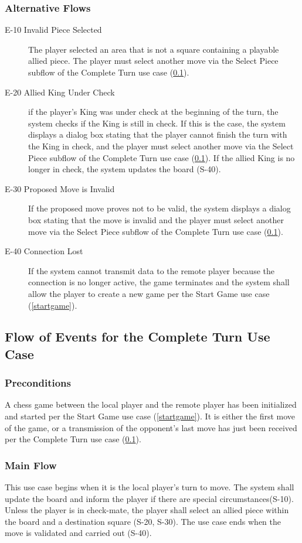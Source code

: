 \subsubsection{Alternative Flows}
\begin{description}
\item[E-10 Invalid Piece Selected]  The player selected an area that is not a square containing a playable allied piece.  The player must select another move via the Select Piece subflow of the Complete Turn use case (\ref{completeturn}). 
\item[E-20 Allied King Under Check] if the player's King was under check at the beginning of the turn, the system checks if the King is still in check.  If this is the case, the system displays a dialog box stating that the player cannot finish the turn with the King in check, and the player must select another move via the Select Piece subflow of the Complete Turn use case  (\ref{completeturn}).  If the allied King is no longer in check, the system updates the board (S-40).
\item[E-30 Proposed Move is Invalid] If the proposed move proves not to be valid, the system displays a dialog box stating that the move is invalid and the player must select another move via the Select Piece subflow of the Complete Turn use case   (\ref{completeturn}). 
\item[E-40 Connection Lost] If the system cannot transmit data to the remote player because the connection is no longer active, the game terminates and the system shall allow the player to create a new game per the Start Game use case (\ref{startgame}). 
\end{description}

\subsection{Flow of Events for the Complete Turn Use Case}
\label{completeturn}
\subsubsection{Preconditions} A chess game between the local player and the remote player has been initialized and started per the Start Game use case (\ref{startgame}). It is either the first move of the game, or a transmission of the opponent's last move has just been received per the Complete Turn use case  (\ref{completeturn}). 
\subsubsection{Main Flow}
  This use case begins when it is the local player's turn to move. The system shall update the board and inform the player if there are special circumstances(S-10).  Unless the player is in check-mate, the player shall select an allied piece within the board and a destination square (S-20, S-30).  The use case ends when the move is validated and carried out (S-40).

